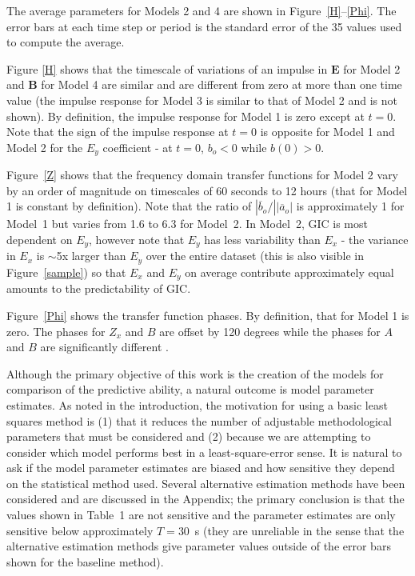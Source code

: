 \documentclass[draft,linenumbers]{agujournal2018}
\begin{document}
The average parameters for Models 2 and 4 are shown in Figure~\ref{H}--\ref{Phi}. The error bars at each time step or period is the standard error of the 35 values used to compute the average. 

Figure \ref{H} shows that the timescale of variations of an impulse in $\mathbf{E}$ for Model 2 and $\mathbf{B}$ for Model 4 are similar and are different from zero at more than one time value (the impulse response for Model 3 is similar to that of Model 2 and is not shown). By definition, the impulse response for Model 1 is zero except at $t=0$. Note that the sign of the impulse response at $t=0$ is opposite for Model 1 and Model 2 for the $E_y$ coefficient - at $t=0$, $b_o < 0$ while $b(0)>0$.

Figure~\ref{Z} shows that the frequency domain transfer functions for Model 2 vary by an order of magnitude on timescales of 60 seconds to 12 hours (that for Model 1 is constant by definition). Note that the ratio of $|\overline{b}_o/||\overline{a}_o|$ is approximately 1 for Model~1 but varies from 1.6 to 6.3 for Model~2. In Model~2, GIC is most dependent on $E_y$, however note that $E_y$ has less variability than $E_x$ - the variance in $E_x$ is $\sim$5x larger than $E_y$ over the entire dataset (this is also visible in Figure~\ref{sample}) so that $E_x$ and $E_y$ on average contribute approximately equal amounts to the predictability of GIC. 

Figure~\ref{Phi} shows the transfer function phases. By definition, that for Model 1 is zero. The phases for $Z_x$ and $B$ are offset by 120 degrees  while the phases for $A$ and $B$ are significantly different .

Although the primary objective of this work is the creation of the models for comparison of the predictive ability, a natural outcome is model parameter estimates. As noted in the introduction, the motivation for using a basic least squares method is (1) that it reduces the number of adjustable methodological parameters that must be considered and (2) because we are attempting to consider which model performs best in a least-square-error sense. It is natural to ask if the model parameter estimates are biased and how sensitive they depend on the statistical method used. Several alternative estimation methods have been considered and are discussed in the Appendix; the primary conclusion is that the values shown in Table~1 are not sensitive and the parameter estimates are only sensitive below approximately $T=30$~s (they are unreliable in the sense that the alternative estimation methods give parameter values outside of the error bars shown for the baseline method).
\end{document}
